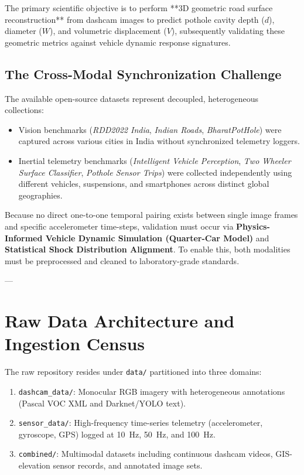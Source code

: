 \documentclass[11pt,a4paper]{article}
\begin{document}
The primary scientific objective is to perform **3D geometric road surface reconstruction** from dashcam images to predict pothole cavity depth ($d$), diameter ($W$), and volumetric displacement ($V$), subsequently validating these geometric metrics against vehicle dynamic response signatures.

\subsection{The Cross-Modal Synchronization Challenge}
The available open-source datasets represent decoupled, heterogeneous collections:
\begin{itemize}
    \item Vision benchmarks (\textit{RDD2022 India}, \textit{Indian Roads}, \textit{BharatPotHole}) were captured across various cities in India without synchronized telemetry loggers.
    \item Inertial telemetry benchmarks (\textit{Intelligent Vehicle Perception}, \textit{Two Wheeler Surface Classifier}, \textit{Pothole Sensor Trips}) were collected independently using different vehicles, suspensions, and smartphones across distinct global geographies.
\end{itemize}
Because no direct one-to-one temporal pairing exists between single image frames and specific accelerometer time-steps, validation must occur via \textbf{Physics-Informed Vehicle Dynamic Simulation (Quarter-Car Model)} and \textbf{Statistical Shock Distribution Alignment}. To enable this, both modalities must be preprocessed and cleaned to laboratory-grade standards.

---

\section{Raw Data Architecture and Ingestion Census}

The raw repository resides under \texttt{data/} partitioned into three domains:
\begin{enumerate}
    \item \texttt{dashcam\_data/}: Monocular RGB imagery with heterogeneous annotations (Pascal VOC XML and Darknet/YOLO text).
    \item \texttt{sensor\_data/}: High-frequency time-series telemetry (accelerometer, gyroscope, GPS) logged at 10~Hz, 50~Hz, and 100~Hz.
    \item \texttt{combined/}: Multimodal datasets including continuous dashcam videos, GIS-elevation sensor records, and annotated image sets.
\end{enumerate}
\end{document}
